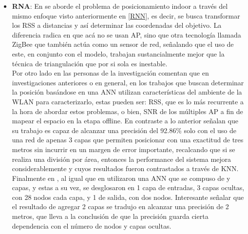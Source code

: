 \begin{enumerate}
{\begin{itemize}
{\begin{itemize}
{            Por este motivo, ellos desarrollaron un sistema que se basa en RNN y que permite clasificar pares ordenados \textit{(x,y)} basados en el RSSI de cada sensor. Específicamente para implementar un tipo de regresión que permite predecir las coordenadas al considerar cada AP como nodo. Algo parecido a lo que se deseaba conseguir en el trabajo presentado en \cite{28}.\\}
            
            \item {\textbf{\ac{RNA}}: En se \cite{26} aborde el problema de posicionamiento indoor a través del mismo enfoque visto anteriormente en \ref{RNN}, es decir, se busca transformar los RSS a distancias y así determinar las coordenadas del objetivo. La diferencia radica en que acá no se usan AP, sino que otra tecnología llamada ZigBee que también actúa como un sensor de red, señalando que el uso de este, en conjunto con el modelo, trabajan sustancialmente mejor que la técnica de triangulación que por si sola es inestable.\\
            
            Por otro lado en \cite{27} las personas de la investigación comentan que en investigaciones anteriores o en general, en los trabajos que buscan determinar la posición basándose en una ANN utilizan características del ambiente de la \ac{WLAN} para caracterizarlo, estas pueden ser: RSS, que es lo más recurrente a la hora de abordar estos problemas, o bien, \ac{SNR} de los múltiples AP a fin de mapear el espacio en la etapa offline. En contraste a lo anterior señalan que su trabajo es capaz de alcanzar una precisión del 92.86\% solo con el uso de una red de apenas 3 capas que permiten posicionar con una exactitud de tres metros sin incurrir en un margen de error importante, recalcando que si se realiza una división por área, entonces la performance del sistema mejora considerablemente y cuyos resultados fueron contrastados a través de KNN.\\
            
            Finalmente en \cite{28}, al igual que en \cite{27} utilizaron una ANN que se compuso de y capas, y estas a su vez, se desglosaron en 1 capa de entradas, 3 capas ocultas, con 28 nodos cada capa, y 1 de salida, con dos nodos. Interesante señalar que el resultado de agregar 2 capas se tradujo en alcanzar una precisión de 2 metros, que lleva a la conclusión de que la precisión guarda cierta dependencia con el número de nodos y capas ocultas.\\}
        \end{itemize}
        }
    \end{itemize}
        }
\end{enumerate}

